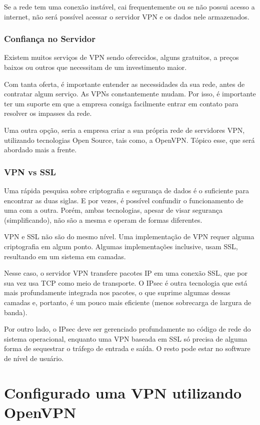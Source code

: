 \documentclass[12pt]{article}
\begin{document}
\begin{flushleft}
Se a rede tem uma conexão instável, cai frequentemente ou se não possui acesso a internet, não será possível acessar o servidor VPN e os dados nele armazenados.

\subsubsection{Confiança no Servidor}
Existem muitos serviços de VPN sendo oferecidos, alguns gratuitos, a preços baixos ou outros que necessitam de um investimento maior.

Com tanta oferta, é importante entender as necessidades da sua rede, antes de contratar algum serviço.  As VPNs constantemente mudam. Por isso, é importante ter um suporte em que a empresa consiga facilmente entrar em contato para resolver os impasses da rede.

Uma outra opção, seria a empresa criar a sua própria rede de servidores VPN, utilizando tecnologias Open Source, tais como, a OpenVPN. Tópico esse, que será abordado mais a frente.


\subsubsection{VPN vs SSL}

Uma rápida pesquisa sobre criptografia e segurança de dados é o suficiente para encontrar as duas siglas. E por vezes, é possível confundir o funcionamento de uma com a outra. Porém, ambas tecnologias, apesar de visar segurança (simplificando), não são a mesma e operam de formas diferentes.

VPN e SSL não são do mesmo nível. Uma implementação de VPN requer alguma criptografia em algum ponto. Algumas implementações inclusive, usam SSL, resultando em um sistema em camadas.

Nesse caso, o servidor  VPN transfere pacotes IP em uma conexão SSL, que por sua vez usa TCP como meio de transporte. O IPsec é outra tecnologia que está mais profundamente integrada nos pacotes, o que suprime algumas dessas camadas e, portanto, é um pouco mais eficiente (menos sobrecarga de largura de banda). 

Por outro lado, o IPsec deve ser gerenciado profundamente no código de rede do sistema operacional, enquanto uma VPN baseada em SSL só precisa de alguma forma de sequestrar o tráfego de entrada e saída. O resto pode estar no software de nível de usuário.


\section{Configurado uma VPN utilizando OpenVPN}



\end{flushleft}
\end{document}
